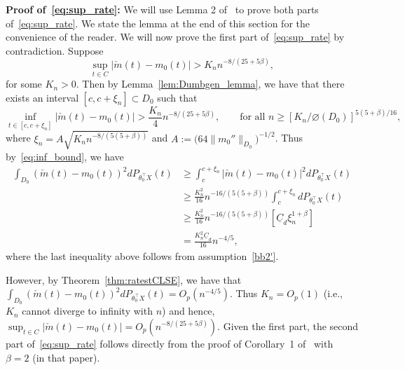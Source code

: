 {%

\textbf{Proof of~\eqref{eq:sup_rate}:}
We will use Lemma 2 of~\cite{DumbgenEtAL04} to prove both parts of~\eqref{eq:sup_rate}. We state the lemma at the end of this section for the convenience of the reader. We will now prove the first part of~\eqref{eq:sup_rate} by contradiction. Suppose 
\[\sup_{t\in C} |\check{m} (t)- m_0 (t)| > K_n n^{-8/(25 + 5\beta)},\] for some $K_n>0.$ Then by Lemma~\ref{lem:Dumbgen_lemma}, we have that there exists an interval $[c, c+\xi_n] \subset D_0$ such that 
\begin{equation}\label{eq:inf_bound}
\inf_{t\in [c, c+\xi_n]} |\check{m} (t)- m_0 (t)| > \frac{K_n}{4} n^{-8/(25 + 5\beta)},\qquad \text{for all }  n \ge [K_n/\diameter(D_0)]^{5(5 + \beta)/16},
\end{equation}
 where $\xi_n = A \sqrt{K_n n^{-8/(5(5 + \beta))}}$  and $A:= \big(64 \|m_0''\|_{D_0}\big)^{-1/2}$.
 Thus by~\eqref{eq:inf_bound}, we have
 \begin{align*}
  \int_{D_0} (\check{m}(t)- m_0 (t))^2 dP_{\theta_0^{\top}X}(t) &\ge \int_{c}^ {c+\xi_n} |\check{m} (t)- m_0 (t)|^2 dP_{\theta_0^{\top}X}(t)  \\
  &\ge \frac{K_n^2}{16} n^{-16/(5(5 + \beta))}   \int_{c}^{c+ \xi_n} dP_{\theta_0^{\top}X}(t)\\
  &\ge \frac{K_n^2}{16} n^{-16/(5(5 + \beta))} \left[\underline{C}_d\xi_n^{1 + \beta}\right]\\
  &= \frac{K_n^2\underline{C}_d}{16}n^{-4/5},
 \end{align*}
 where the last inequality above follows from assumption~\ref{bb2'}.

 However, by Theorem~\ref{thm:ratestCLSE}, we have that $\int_{D_0} (\check{m}(t)- m_0 (t))^2dP_{\theta_0^{\top}X}(t)  =O_p(n^{-4/5})$. Thus $K_n =O_p(1)$ (i.e., $K_n$ cannot diverge to infinity with $n$) and hence, $\sup_{t\in C} |\check{m} (t)- m_0 (t)| = O_p( n^{-8/(25+5\beta)}).$ Given the first part, the second part of~\eqref{eq:sup_rate} follows directly from the proof of Corollary~1 of~\cite{DumbgenEtAL04} with $\beta = 2$ (in that paper). 
}
